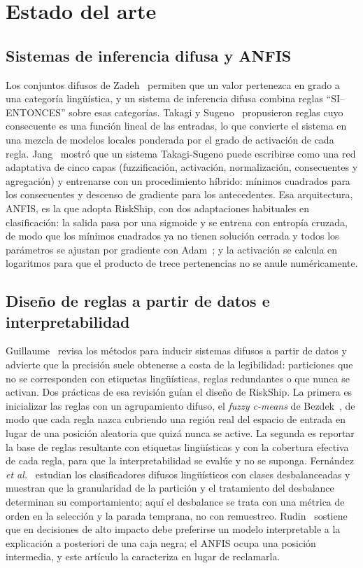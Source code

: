 \documentclass[conference]{IEEEtran}
\begin{document}
\section{Estado del arte}
\label{sec:estado}

\subsection{Sistemas de inferencia difusa y ANFIS}

Los conjuntos difusos de Zadeh~\cite{zadeh} permiten que un valor pertenezca
en grado a una categoría lingüística, y un sistema de inferencia difusa
combina reglas ``SI--ENTONCES'' sobre esas categorías. Takagi y
Sugeno~\cite{takagi} propusieron reglas cuyo consecuente es una función
lineal de las entradas, lo que convierte el sistema en una mezcla de modelos
locales ponderada por el grado de activación de cada regla. Jang~\cite{jang}
mostró que un sistema Takagi-Sugeno puede escribirse como una red adaptativa
de cinco capas (fuzzificación, activación, normalización, consecuentes y
agregación) y entrenarse con un procedimiento híbrido: mínimos cuadrados para
los consecuentes y descenso de gradiente para los antecedentes. Esa
arquitectura, ANFIS, es la que adopta RiskShip, con dos adaptaciones
habituales en clasificación: la salida pasa por una sigmoide y se entrena con
entropía cruzada, de modo que los mínimos cuadrados ya no tienen solución
cerrada y todos los parámetros se ajustan por gradiente con
Adam~\cite{adam}; y la activación se calcula en logaritmos para que el
producto de trece pertenencias no se anule numéricamente.

\subsection{Diseño de reglas a partir de datos e interpretabilidad}

Guillaume~\cite{guillaume} revisa los métodos para inducir sistemas difusos a
partir de datos y advierte que la precisión suele obtenerse a costa de la
legibilidad: particiones que no se corresponden con etiquetas lingüísticas,
reglas redundantes o que nunca se activan. Dos prácticas de esa revisión
guían el diseño de RiskShip. La primera es inicializar las reglas con un
agrupamiento difuso, el \textit{fuzzy c-means} de Bezdek~\cite{bezdek}, de
modo que cada regla nazca cubriendo una región real del espacio de entrada en
lugar de una posición aleatoria que quizá nunca se active. La segunda es
reportar la base de reglas resultante con etiquetas lingüísticas y con la
cobertura efectiva de cada regla, para que la interpretabilidad se evalúe y
no se suponga. Fernández \textit{et al.}~\cite{fernandez} estudian los
clasificadores difusos lingüísticos con clases desbalanceadas y muestran que
la granularidad de la partición y el tratamiento del desbalance determinan su
comportamiento; aquí el desbalance se trata con una métrica de orden en la
selección y la parada temprana, no con remuestreo. Rudin~\cite{rudin}
sostiene que en decisiones de alto impacto debe preferirse un modelo
interpretable a la explicación a posteriori de una caja negra; el ANFIS ocupa
una posición intermedia, y este artículo la caracteriza en lugar de
reclamarla.
\end{document}
